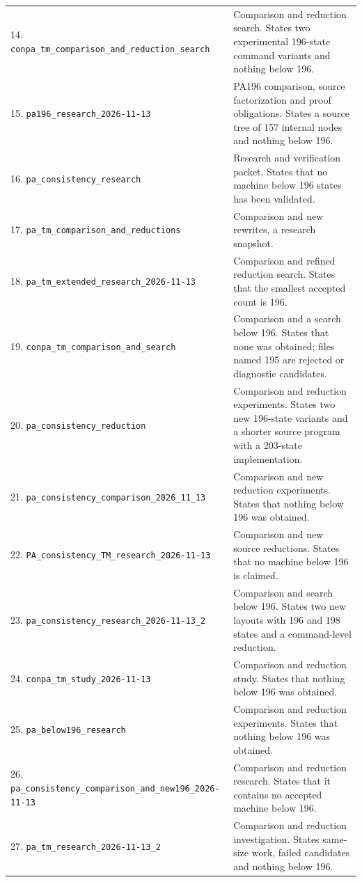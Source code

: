 \begin{longtable}{@{}p{.37\linewidth}p{.59\linewidth}@{}}
14. \nolinkurl{conpa_tm_comparison_and_reduction_search} & Comparison and reduction search. States two experimental 196-state command variants and nothing below 196.\\[4pt]
15. \nolinkurl{pa196_research_2026-11-13} & PA196 comparison, source factorization and proof obligations. States a source tree of 157 internal nodes and nothing below 196.\\[4pt]
16. \nolinkurl{pa_consistency_research} & Research and verification packet. States that no machine below 196 states has been validated.\\[4pt]
17. \nolinkurl{pa_tm_comparison_and_reductions} & Comparison and new rewrites, a research snapshot.\\[4pt]
18. \nolinkurl{pa_tm_extended_research_2026-11-13} & Comparison and refined reduction search. States that the smallest accepted count is 196.\\[4pt]
19. \nolinkurl{conpa_tm_comparison_and_search} & Comparison and a search below 196. States that none was obtained; files named 195 are rejected or diagnostic candidates.\\[4pt]
20. \nolinkurl{pa_consistency_reduction} & Comparison and reduction experiments. States two new 196-state variants and a shorter source program with a 203-state implementation.\\[4pt]
21. \nolinkurl{pa_consistency_comparison_2026_11_13} & Comparison and new reduction experiments. States that nothing below 196 was obtained.\\[4pt]
22. \nolinkurl{PA_consistency_TM_research_2026-11-13} & Comparison and new source reductions. States that no machine below 196 is claimed.\\[4pt]
23. \nolinkurl{pa_consistency_research_2026-11-13_2} & Comparison and search below 196. States two new layouts with 196 and 198 states and a command-level reduction.\\[4pt]
24. \nolinkurl{conpa_tm_study_2026-11-13} & Comparison and reduction study. States that nothing below 196 was obtained.\\[4pt]
25. \nolinkurl{pa_below196_research} & Comparison and reduction experiments. States that nothing below 196 was obtained.\\[4pt]
26. \nolinkurl{pa_consistency_comparison_and_new196_2026-11-13} & Comparison and reduction research. States that it contains no accepted machine below 196.\\[4pt]
27. \nolinkurl{pa_tm_research_2026-11-13_2} & Comparison and reduction investigation. States same-size work, failed candidates and nothing below 196.\\[4pt]

\end{longtable}
